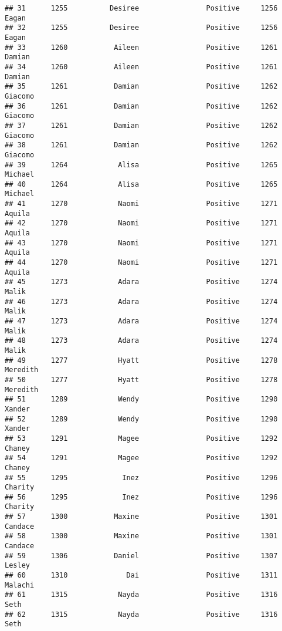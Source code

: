 \documentclass[
]{article}
\begin{document}
\begin{verbatim}
## 31      1255          Desiree                Positive     1256            Eagan
## 32      1255          Desiree                Positive     1256            Eagan
## 33      1260           Aileen                Positive     1261           Damian
## 34      1260           Aileen                Positive     1261           Damian
## 35      1261           Damian                Positive     1262          Giacomo
## 36      1261           Damian                Positive     1262          Giacomo
## 37      1261           Damian                Positive     1262          Giacomo
## 38      1261           Damian                Positive     1262          Giacomo
## 39      1264            Alisa                Positive     1265          Michael
## 40      1264            Alisa                Positive     1265          Michael
## 41      1270            Naomi                Positive     1271           Aquila
## 42      1270            Naomi                Positive     1271           Aquila
## 43      1270            Naomi                Positive     1271           Aquila
## 44      1270            Naomi                Positive     1271           Aquila
## 45      1273            Adara                Positive     1274            Malik
## 46      1273            Adara                Positive     1274            Malik
## 47      1273            Adara                Positive     1274            Malik
## 48      1273            Adara                Positive     1274            Malik
## 49      1277            Hyatt                Positive     1278         Meredith
## 50      1277            Hyatt                Positive     1278         Meredith
## 51      1289            Wendy                Positive     1290           Xander
## 52      1289            Wendy                Positive     1290           Xander
## 53      1291            Magee                Positive     1292           Chaney
## 54      1291            Magee                Positive     1292           Chaney
## 55      1295             Inez                Positive     1296          Charity
## 56      1295             Inez                Positive     1296          Charity
## 57      1300           Maxine                Positive     1301          Candace
## 58      1300           Maxine                Positive     1301          Candace
## 59      1306           Daniel                Positive     1307           Lesley
## 60      1310              Dai                Positive     1311          Malachi
## 61      1315            Nayda                Positive     1316             Seth
## 62      1315            Nayda                Positive     1316             Seth

\end{verbatim}
\end{document}
